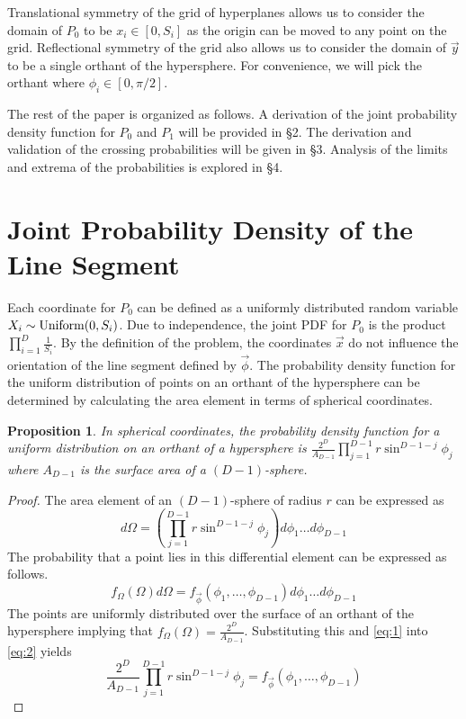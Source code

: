 \documentclass{article}
\newtheorem{proposition}{Proposition}
\begin{document}
Translational symmetry of the grid of hyperplanes allows us to consider the domain of $P_0$ to be $x_i\in[0,S_i]$ as the origin can be moved to any point on the grid.
Reflectional symmetry of the grid also allows us to consider the domain of $\vec{y}$ to be a single orthant of the hypersphere. For convenience, we will pick the orthant where
$\phi_i \in [0, \pi/2]$.

The rest of the paper is organized as follows. A derivation of the joint probability density function for $P_0$ and $P_1$ will be provided in \S 2. The derivation and validation
of the crossing probabilities will be given in \S 3. Analysis of the limits and extrema of the probabilities is explored in \S 4.

\section{Joint Probability Density of the Line Segment}
Each coordinate for $P_0$ can be defined as a uniformly distributed random variable $X_i\sim{\rm Uniform}(0,S_i)$. Due to independence, the joint PDF for $P_0$ is the product
$\prod_{i=1}^D \frac{1}{S_i}$. By the definition of the problem, the coordinates $\vec{x}$ do not influence the orientation of the line segment defined by $\vec{\phi}$. 
The probability density function for the uniform distribution of points on an orthant of the hypersphere can be determined by calculating the area element in terms of spherical coordinates.

\begin{proposition}
In spherical coordinates, the probability density function for a uniform distribution on an orthant of a hypersphere is $\frac{2^D}{A_{D-1}}\prod_{j=1}^{D-1}r\sin^{D-1-j}\phi_j$ where
$A_{D-1}$ is the surface area of a $(D-1)$-sphere.
\end{proposition}
\begin{proof}
	The area element of an $(D-1)$-sphere of radius $r$ can be expressed as 
	\begin{equation} \label{eq:1}
	d\Omega = \left(\prod_{j=1}^{D-1}r\sin^{D-1-j}\phi_j\right)d\phi_1 \hdots d\phi_{D-1}
	\end{equation}
	The probability that a point lies in this differential element can be expressed as follows.
	\begin{equation} \label{eq:2}
	f_{\Omega}(\Omega)d\Omega = f_{\vec{\phi}}(\phi_1, \hdots, \phi_{D-1})d\phi_1 \hdots d\phi_{D-1}
	\end{equation}
	The points are uniformly distributed over the surface of an orthant of the hypersphere implying that $f_{\Omega}(\Omega) = \frac{2^D}{A_{D-1}}$. Substituting this and
	\ref{eq:1} into \ref{eq:2} yields
	\begin{equation}
	\frac{2^D}{A_{D-1}}\prod_{j=1}^{D-1}r\sin^{D-1-j}\phi_j = f_{\vec{\phi}}(\phi_1, \hdots, \phi_{D-1})
	\end{equation}
\end{proof}
\end{document}
